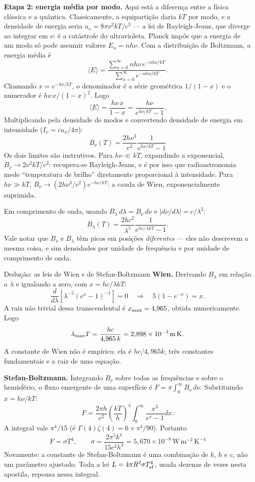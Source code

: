 \documentclass[11pt,a4paper]{article}
\begin{document}
\textbf{Etapa 2: energia média por modo.} Aqui está a diferença entre a física clássica e a quântica. Classicamente, a equipartição daria $kT$ por modo, e a densidade de energia seria $u_\nu=8\pi\nu^{2}kT/c^{3}$ --- a lei de Rayleigh-Jeans, que diverge ao integrar em $\nu$: é a catástrofe do ultravioleta. Planck impôs que a energia de um modo só pode assumir valores $E_n=nh\nu$. Com a distribuição de Boltzmann, a energia média é
\[
\langle E\rangle=\frac{\sum_{n=0}^{\infty}nh\nu\,e^{-nh\nu/kT}}{\sum_{n=0}^{\infty}e^{-nh\nu/kT}}.
\]
Chamando $x=e^{-h\nu/kT}$, o denominador é a série geométrica $1/(1-x)$ e o numerador é $h\nu\,x/(1-x)^{2}$. Logo
\[
\langle E\rangle=\frac{h\nu\,x}{1-x}=\frac{h\nu}{e^{h\nu/kT}-1}.
\]
Multiplicando pela densidade de modos e convertendo densidade de energia em intensidade ($I_\nu=cu_\nu/4\pi$):
\[
\boxed{\ B_\nu(T)=\frac{2h\nu^{3}}{c^{2}}\frac{1}{e^{h\nu/kT}-1}\ }
\]
Os dois limites são instrutivos. Para $h\nu\ll kT$, expandindo a exponencial, $B_\nu\to2\nu^{2}kT/c^{2}$: recupera-se Rayleigh-Jeans, e é por isso que radioastronomia mede ``temperatura de brilho'' diretamente proporcional à intensidade. Para $h\nu\gg kT$, $B_\nu\to(2h\nu^{3}/c^{2})e^{-h\nu/kT}$: a cauda de Wien, exponencialmente suprimida.

Em comprimento de onda, usando $B_\lambda\,d\lambda=B_\nu\,d\nu$ e $|d\nu/d\lambda|=c/\lambda^{2}$:
\[
B_\lambda(T)=\frac{2hc^{2}}{\lambda^{5}}\frac{1}{e^{hc/\lambda kT}-1}.
\]
Vale notar que $B_\nu$ e $B_\lambda$ têm picos em posições \emph{diferentes} --- eles não descrevem a mesma coisa, e sim densidades por unidade de frequência e por unidade de comprimento de onda.

\begin{lessonblock}[borderline west={2pt}{0pt}{astroGold}]{Dedução: as leis de Wien e de Stefan-Boltzmann}
\textbf{Wien.} Derivando $B_\lambda$ em relação a $\lambda$ e igualando a zero, com $x=hc/\lambda kT$:
\[
\frac{d}{d\lambda}\left[\lambda^{-5}\left(e^{x}-1\right)^{-1}\right]=0
\quad\Longrightarrow\quad
5\left(1-e^{-x}\right)=x.
\]
A raiz não trivial dessa transcendental é $x_{\rm max}=4{,}965$, obtida numericamente. Logo
\[
\lambda_{\rm max}T=\frac{hc}{4{,}965\,k}=2{,}898\times10^{-3}\,\mathrm{m\,K}.
\]
A constante de Wien não é empírica: ela é $hc/4{,}965k$, três constantes fundamentais e a raiz de uma equação.

\textbf{Stefan-Boltzmann.} Integrando $B_\nu$ sobre todas as frequências e sobre o hemisfério, o fluxo emergente de uma superfície é $F=\pi\int_0^\infty B_\nu\,d\nu$. Substituindo $x=h\nu/kT$:
\[
F=\frac{2\pi h}{c^{2}}\left(\frac{kT}{h}\right)^{4}\int_0^{\infty}\frac{x^{3}}{e^{x}-1}dx.
\]
A integral vale $\pi^{4}/15$ (é $\Gamma(4)\zeta(4)=6\times\pi^4/90$). Portanto
\[
\boxed{\ F=\sigma T^{4},\qquad \sigma=\frac{2\pi^{5}k^{4}}{15c^{2}h^{3}}=5{,}670\times10^{-8}\,\mathrm{W\,m^{-2}\,K^{-4}}\ }
\]
Novamente: a constante de Stefan-Boltzmann é uma combinação de $k$, $h$ e $c$, não um parâmetro ajustado. Toda a lei $L=4\pi R^{2}\sigma T_{\rm ef}^{4}$, usada dezenas de vezes nesta apostila, repousa nessa integral.
\end{lessonblock}
\end{document}
